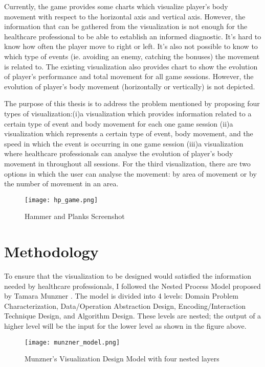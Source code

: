 Currently, the game provides some charts which visualize player's body movement with respect to the horizontal axis and vertical axis. However, the information that can be gathered from the visualization is not enough for the healthcare professional to be able to establish an informed diagnostic. It's hard to know how often the player move to right or left. It's also not possible to know to which type of events (ie. avoiding an enemy, catching the bonuses) the movement is related to. The existing visualization also provides chart to show the evolution of player's performance and total movement for all game sessions. However, the evolution of player's body movement (horizontally or vertically) is not depicted.

The purpose of this thesis is to address the problem mentioned by proposing four types of visualization:(i)a visualization which provides information related to a certain type of event and body movement for each one game session (ii)a visualization which represents a certain type of event, body movement, and the speed in which the event is occurring in one game session (iii)a visualization where healthcare professionals can analyse the evolution of player's body movement in throughout all sessions. For the third visualization, there are two options in which the user can analyse the movement: by area of movement or by the number of movement in an area.

\begin{figure}
\centering
\texttt{[image: hp\_game.png]}
\caption{Hammer and Planks Screenshot \label{overflow}}
\end{figure}


\section{Methodology}

To ensure that the visualization to be designed would satisfied the information needed by healthcare professionals, I followed the Nested Process Model proposed by Tamara Munzner \cite{Munzner:2009:NMV:1638611.1639181}. The model is divided into 4 levels: Domain Problem Characterization, Data/Operation Abstraction Design, Encoding/Interaction Technique Design, and Algorithm Design. These levels are nested; the output of a higher level will be the input for the lower level as shown in the figure above.

\begin{figure}
\centering
\texttt{[image: munzner\_model.png]}
\caption{Munzner's Visualization Design Model with four nested layers \label{overflow}}
\end{figure}

